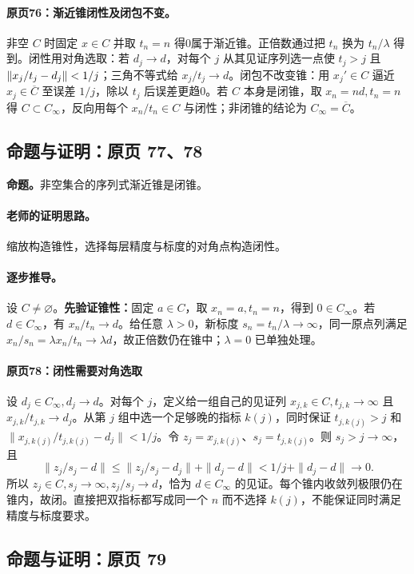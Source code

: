 \paragraph{原页76：渐近锥闭性及闭包不变。}非空 $C$ 时固定 $x\in C$ 并取 $t_n=n$ 得0属于渐近锥。正倍数通过把 $t_n$ 换为 $t_n/\lambda$ 得到。闭性用对角选取：若 $d_j\to d$，对每个 $j$ 从其见证序列选一点使 $t_j>j$ 且 $\left\lVert x_j/t_j-d_j\right\rVert<1/j$；三角不等式给 $x_j/t_j\to d$。闭包不改变锥：用 $x_j'\in C$ 逼近 $x_j\in\overline C$ 至误差 $1/j$，除以 $t_j$ 后误差更趋0。若 $C$ 本身是闭锥，取 $x_n=nd,t_n=n$ 得 $C\subset C_\infty$，反向用每个 $x_n/t_n\in C$ 与闭性；非闭锥的结论为 $C_\infty=\overline C$。



\subsection{命题与证明：原页 77、78}

\textbf{命题。}非空集合的序列式渐近锥是闭锥。

\paragraph{老师的证明思路。}缩放构造锥性，选择每层精度与标度的对角点构造闭性。

\paragraph{逐步推导。}
设 $C\ne\varnothing$。\textbf{先验证锥性：}固定 $a\in C$，取 $x_n=a,t_n=n$，得到 $0\in C_\infty$。若 $d\in C_\infty$，有 $x_n/t_n\to d$。给任意 $\lambda>0$，新标度 $s_n=t_n/\lambda\to\infty$，同一原点列满足 $x_n/s_n=\lambda x_n/t_n\to\lambda d$，故正倍数仍在锥中；$\lambda=0$ 已单独处理。
\paragraph{原页78：闭性需要对角选取}
设 $d_j\in C_\infty,d_j\to d$。对每个 $j$，定义给一组自己的见证列 $x_{j,k}\in C,t_{j,k}\to\infty$ 且 $x_{j,k}/t_{j,k}\to d_j$。从第 $j$ 组中选一个足够晚的指标 $k(j)$，同时保证 $t_{j,k(j)}>j$ 和 $\|x_{j,k(j)}/t_{j,k(j)}-d_j\|<1/j$。令 $z_j=x_{j,k(j)}$、$s_j=t_{j,k(j)}$。则 $s_j>j\to\infty$，且
\[\|z_j/s_j-d\|\le\|z_j/s_j-d_j\|+\|d_j-d\|<1/j+\|d_j-d\|\to0.\]
所以 $z_j\in C,s_j\to\infty,z_j/s_j\to d$，恰为 $d\in C_\infty$ 的见证。每个锥内收敛列极限仍在锥内，故闭。直接把双指标都写成同一个 $n$ 而不选择 $k(j)$，不能保证同时满足精度与标度要求。


\subsection{命题与证明：原页 79}

